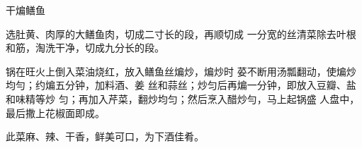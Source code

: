 \begin{recipe}{干煸鳝鱼}

\ingredients




\cooking

\step 	选肚黄、肉厚的大鳝鱼肉，切成二寸长的段，再顺切成 一分宽的丝清菜除去叶根和筋，淘洗干净，切成九分长的段。

\step 	锅在旺火上倒入菜油烧红，放入鳝鱼丝煸炒，煸炒时 荽不断用汤瓢翻动，使煸炒均勻；约煸五分钟，加料酒、姜 丝和蒜丝；炒匀后再煸一分钟，即放入豆瓣、盐和味精等炒 匀；再加入芹菜，翻炒均匀；然后烹入醋炒勻，马上起锅盛 人盘中，最后撒上花椒面即成。

\notes

此菜麻、辣、干香，鲜美可口，为下酒佳肴。

\end{recipe}

